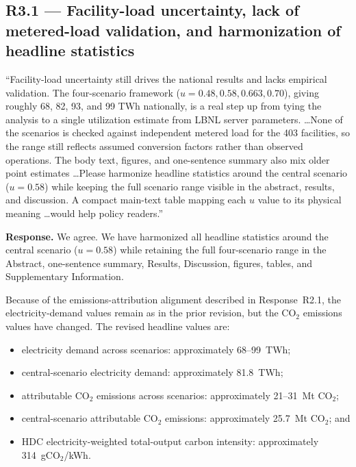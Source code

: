 \documentclass[11pt]{article}
\newenvironment{revquote}{%
  \begin{mdframed}[
    leftmargin=0.5em,
    rightmargin=0.5em,
    linewidth=0pt,
    backgroundcolor=gray!8,
    skipabove=0.5em,
    skipbelow=0.5em,
    innertopmargin=0.6em,
    innerbottommargin=0.6em,
    innerleftmargin=0.8em,
    innerrightmargin=0.8em
  ]%
  \itshape%
}{%
  \end{mdframed}%
}
\begin{document}
\subsection*{R3.1 --- Facility-load uncertainty, lack of metered-load validation, and harmonization of headline statistics}

\begin{revquote}
``Facility-load uncertainty still drives the national results and lacks empirical validation. The four-scenario framework ($u = 0.48, 0.58, 0.663, 0.70$), giving roughly 68, 82, 93, and 99 TWh nationally, is a real step up from tying the analysis to a single utilization estimate from LBNL server parameters. \ldots None of the scenarios is checked against independent metered load for the 403 facilities, so the range still reflects assumed conversion factors rather than observed operations. The body text, figures, and one-sentence summary also mix older point estimates \ldots Please harmonize headline statistics around the central scenario ($u = 0.58$) while keeping the full scenario range visible in the abstract, results, and discussion. A compact main-text table mapping each $u$ value to its physical meaning \ldots would help policy readers.''
\end{revquote}

\textbf{Response.} We agree. We have harmonized all headline statistics around the central scenario ($u=0.58$) while retaining the full four-scenario range in the Abstract, one-sentence summary, Results, Discussion, figures, tables, and Supplementary Information.

Because of the emissions-attribution alignment described in Response~R2.1, the electricity-demand values remain as in the prior revision, but the CO$_2$ emissions values have changed. The revised headline values are:

\begin{itemize}
    \item electricity demand across scenarios: approximately 68--99~TWh;
    \item central-scenario electricity demand: approximately 81.8~TWh;
    \item attributable CO$_2$ emissions across scenarios: approximately 21--31~Mt CO$_2$;
    \item central-scenario attributable CO$_2$ emissions: approximately 25.7~Mt CO$_2$; and
    \item HDC electricity-weighted total-output carbon intensity: approximately 314~gCO$_2$/kWh.
\end{itemize}
\end{document}

